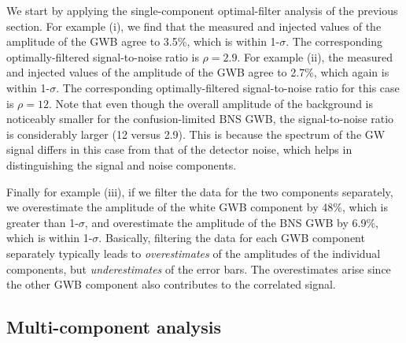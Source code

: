 We start by applying the single-component optimal-filter
analysis of the previous section.
For example (i), we find that the measured and injected
values of the amplitude of the GWB agree to 3.5\%, 
which is within 1-$\sigma$.
The corresponding optimally-filtered signal-to-noise
ratio is $\rho=2.9$.
For example (ii), the measured and injected values of
the amplitude of the GWB agree to 2.7\%, which again 
is within 1-$\sigma$.
The corresponding optimally-filtered signal-to-noise
ratio for this case is $\rho=12$.
Note that even though the overall amplitude of the
background is noticeably smaller for the confusion-limited
BNS GWB, the signal-to-noise ratio is considerably
larger (12 versus 2.9).
This is because the spectrum of the GW signal differs 
in this case from that of the detector noise,
which helps in distinguishing the signal and noise components.

Finally for example (iii), if we filter the data for 
the two components separately, 
we overestimate the amplitude of the white GWB component 
by 48\%, which is greater than 1-$\sigma$, and overestimate
the amplitude of the BNS GWB by 6.9\%, which is within 1-$\sigma$.
Basically, filtering the data for each GWB component 
separately typically leads to {\em overestimates}
of the amplitudes of the individual components, 
but {\em underestimates} of the error bars.
The overestimates arise since the other GWB component
also contributes to the correlated signal.

\subsection{Multi-component analysis}

